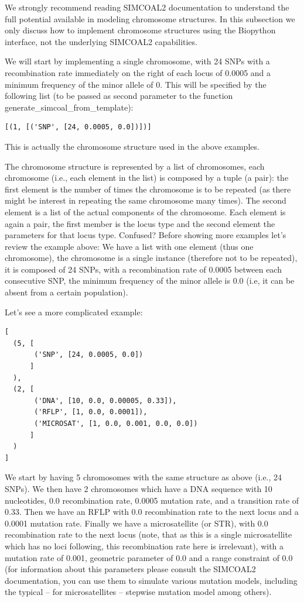 \documentclass{report}
\begin{document}
We strongly recommend reading SIMCOAL2 documentation to understand the full potential
available in modeling chromosome structures. In this subsection we only discuss how
to implement chromosome structures using the Biopython interface, not the underlying
SIMCOAL2 capabilities.

We will start by implementing a single chromosome, with 24 SNPs with
a recombination rate immediately on the right of each locus of 0.0005 and a
minimum frequency of the minor allele of 0. This will be specified by the
following list (to be passed as second parameter to the function
generate\_simcoal\_from\_template):

\begin{verbatim}
[(1, [('SNP', [24, 0.0005, 0.0])])]
\end{verbatim}

This is actually the chromosome structure used in the above examples.


The chromosome structure is represented by a list of chromosomes,
each chromosome (i.e., each element in the list)
is composed by a tuple (a pair): the first element
is the number of times the chromosome is to be repeated (as there
might be interest in repeating the same chromosome many times).
The second element is a list of the actual components of the chromosome.
Each element is again a pair, the first member is the locus type and
the second element the parameters for that locus type. Confused?
Before showing more examples let's review the example above: We have
a list with one element (thus one chromosome), the chromosome is
a single instance (therefore not to be repeated), it is composed
of 24 SNPs, with a recombination rate of 0.0005 between each
consecutive SNP, the minimum frequency of the minor allele is
0.0 (i.e, it can be absent from a certain population).

Let's see a more complicated example:

\begin{verbatim}
[
  (5, [
       ('SNP', [24, 0.0005, 0.0])
      ]
  ),
  (2, [
       ('DNA', [10, 0.0, 0.00005, 0.33]),
       ('RFLP', [1, 0.0, 0.0001]),
       ('MICROSAT', [1, 0.0, 0.001, 0.0, 0.0])
      ]
  )
]
\end{verbatim}

We start by having 5 chromosomes with the same structure as
above (i.e., 24 SNPs). We then have 2 chromosomes which
have a DNA sequence with 10 nucleotides, 0.0 recombination rate,
0.0005 mutation rate, and a transition rate of 0.33. Then we
have an RFLP with 0.0 recombination rate to the next locus and
a 0.0001 mutation rate. Finally we have a microsatellite (or STR),
with 0.0 recombination rate to the next locus (note, that as this
is a single microsatellite which has no loci following, this
recombination rate here is irrelevant), with a mutation rate
of 0.001, geometric parameter of 0.0 and a range constraint
of 0.0 (for information about this parameters please consult
the SIMCOAL2 documentation, you can use them to simulate
various mutation models, including the typical  -- for microsatellites --
stepwise mutation model among others).
\end{document}
